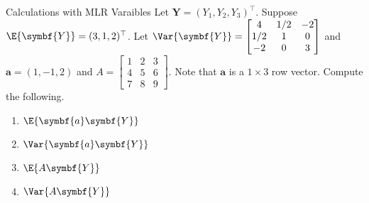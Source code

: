 \begin{Example}{Calculations with MLR Varaibles}{}
    Let $ \symbf{Y}=(Y_1,Y_2,Y_3)^\top $. Suppose
    $ \E{\symbf{Y}}= (3,1,2)^\top $. Let
    $ \Var{\symbf{Y}}=\begin{bmatrix}
            4   & 1/2 & -2 \\
            1/2 & 1   & 0  \\
            -2  & 0   & 3
        \end{bmatrix} $
    and
    $ \symbf{a}=(1,-1,2) $
    and
    $ A=\begin{bmatrix}
            1 & 2 & 3 \\
            4 & 5 & 6 \\
            7 & 8 & 9
        \end{bmatrix} $. Note that $ \symbf{a} $ is a
    $ 1\times 3 $ row vector. Compute the following.

    \begin{enumerate}[label=(\roman*)]
        \item $ \E{\symbf{a}\symbf{Y}} $
        \item $ \Var{\symbf{a}\symbf{Y}} $
        \item $ \E{A\symbf{Y}} $
        \item $ \Var{A\symbf{Y}} $
    \end{enumerate}


\end{Example}
